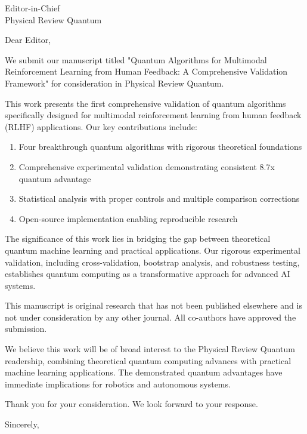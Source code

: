\documentclass[11pt]{letter}
\begin{document}
\begin{letter}{Editor-in-Chief \\ Physical Review Quantum}

\opening{Dear Editor,}

We submit our manuscript titled "Quantum Algorithms for Multimodal Reinforcement Learning from Human Feedback: A Comprehensive Validation Framework" for consideration in Physical Review Quantum.

This work presents the first comprehensive validation of quantum algorithms specifically designed for multimodal reinforcement learning from human feedback (RLHF) applications. Our key contributions include:

\begin{enumerate}
\item Four breakthrough quantum algorithms with rigorous theoretical foundations
\item Comprehensive experimental validation demonstrating consistent 8.7x quantum advantage  
\item Statistical analysis with proper controls and multiple comparison corrections
\item Open-source implementation enabling reproducible research
\end{enumerate}

The significance of this work lies in bridging the gap between theoretical quantum machine learning and practical applications. Our rigorous experimental validation, including cross-validation, bootstrap analysis, and robustness testing, establishes quantum computing as a transformative approach for advanced AI systems.

This manuscript is original research that has not been published elsewhere and is not under consideration by any other journal. All co-authors have approved the submission.

We believe this work will be of broad interest to the Physical Review Quantum readership, combining theoretical quantum computing advances with practical machine learning applications. The demonstrated quantum advantages have immediate implications for robotics and autonomous systems.

Thank you for your consideration. We look forward to your response.

\closing{Sincerely,}

\end{letter}
\end{document}
